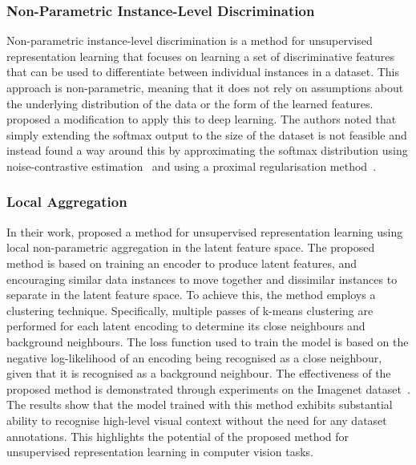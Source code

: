 \subsubsection{Non-Parametric Instance-Level Discrimination}
\label{subsubsec:non-parametric_instance-level_discrimination}
Non-parametric instance-level discrimination is a method for unsupervised representation learning that focuses on learning a set of discriminative features that can be used to differentiate between individual instances in a dataset. This approach is non-parametric, meaning that it does not rely on assumptions about the underlying distribution of the data or the form of the learned features. \cite{wu2018unsupervised} proposed a modification to apply this to deep learning. The authors noted that simply extending the softmax output to the size of the dataset is not feasible and instead found a way around this by approximating the softmax distribution using noise-contrastive estimation~\citep{gutmann2010noise} and using a proximal regularisation method~\citep{parikh2014proximal}.

\subsubsection{Local Aggregation}
\label{subsubsec:local_aggregation}
In their work, \cite{zhuang2019local} proposed a method for unsupervised representation learning using local non-parametric aggregation in the latent feature space. The proposed method is based on training an encoder to produce latent features, and encouraging similar data instances to move together and dissimilar instances to separate in the latent feature space. To achieve this, the method employs a clustering technique. Specifically, multiple passes of k-means clustering are performed for each latent encoding to determine its close neighbours and background neighbours. The loss function used to train the model is based on the negative log-likelihood of an encoding being recognised as a close neighbour, given that it is recognised as a background neighbour. The effectiveness of the proposed method is demonstrated through experiments on the Imagenet dataset~\citep{deng2009imagenet}. The results show that the model trained with this method exhibits substantial ability to recognise high-level visual context without the need for any dataset annotations. This highlights the potential of the proposed method for unsupervised representation learning in computer vision tasks.


